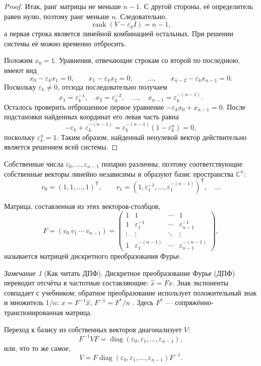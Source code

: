 \documentclass[12pt,a4paper]{article}
\theoremstyle{definition}
\theoremstyle{remark}
\newtheorem*{remark}{Замечание}
\DeclareMathOperator{\diag}{diag}
\newcommand{\CC}{\mathbb{C}}
\newcommand{\eps}{\varepsilon}
\begin{document}
\begin{proof}
Итак, ранг матрицы не меньше $n-1$. С другой стороны, её определитель равен
нулю, поэтому ранг меньше $n$. Следовательно,
\[
  \operatorname{rank}(V-\eps_kI)=n-1,
\]
а первая строка является линейной комбинацией остальных. При решении системы
её можно временно отбросить.

Положим $x_0=1$. Уравнения, отвечающие строкам со второй по последнюю,
имеют вид
\[
  x_0-\eps_kx_1=0,\qquad
  x_1-\eps_kx_2=0,\qquad\dots,\qquad
  x_{n-2}-\eps_kx_{n-1}=0.
\]
Поскольку $\eps_k\ne0$, отсюда последовательно получаем
\[
  x_1=\eps_k^{-1},\quad x_2=\eps_k^{-2},\quad\dots,\quad
  x_{n-1}=\eps_k^{-(n-1)}.
\]
Осталось проверить отброшенное первое уравнение
$-\eps_kx_0+x_{n-1}=0$. После подстановки найденных координат его левая
часть равна
\[
  -\eps_k+\eps_k^{-(n-1)}
  =\eps_k^{-(n-1)}(1-\eps_k^n)=0,
\]
поскольку $\eps_k^n=1$. Таким образом, найденный ненулевой вектор
действительно является решением всей системы.
\end{proof}

Собственные числа $\eps_0,\dots,\eps_{n-1}$ попарно различны, поэтому
соответствующие собственные векторы линейно независимы и образуют базис
пространства $\CC^n$:
\[
  v_0=(1,1,\dots,1)^{\mathsf T},\qquad
  v_1=(1,\eps_1^{-1},\dots,\eps_1^{-(n-1)})^{\mathsf T},\quad\dots
\]

Матрица, составленная из этих векторов-столбцов,
\[
  F=(v_0\ v_1\ \cdots\ v_{n-1})
   =\begin{pmatrix}
      1 & 1 & \cdots & 1\\
      1 & \eps_1^{-1} & \cdots & \eps_{n-1}^{-1}\\
      \vdots & \vdots & \ddots & \vdots\\
      1 & \eps_1^{-(n-1)} & \cdots & \eps_{n-1}^{-(n-1)}
    \end{pmatrix},
\]
называется матрицей дискретного преобразования Фурье.

\begin{remark}[Как читать ДПФ]
Дискретное преобразование Фурье (ДПФ) переводит отсчёты в частотные
составляющие: $\widehat x=Fx$.
Знак экспоненты совпадает с учебником; обратное преобразование
использует положительный знак и множитель $1/n$:
$x=F^{-1}\widehat x$, $F^{-1}=F^*/n$
\cite[\S\,4.4.1, с.~269]{GW2012}.
Здесь $F^*$ --- сопряжённо-транспонированная матрица.
\end{remark}

Переход к базису из собственных векторов диагонализует $V$:
\[
  F^{-1}VF=\diag(\eps_0,\eps_1,\dots,\eps_{n-1}),
\]
или, что то же самое,
\[
  V=F\diag(\eps_0,\eps_1,\dots,\eps_{n-1})F^{-1}.
\]
\end{document}
